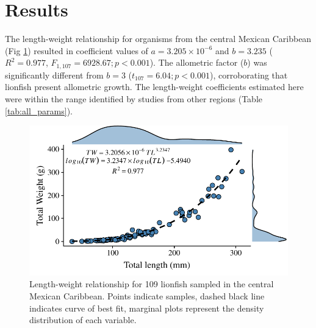 \documentclass[fleqn,10pt,lineno]{wlpeerj} %
\begin{document}
\clearpage

\section*{Results}

The length-weight relationship for organisms from the central Mexican
Caribbean (Fig \ref{fig:l-w-carib}) resulted in coefficient values of
\(a = 3.205 \times 10^{-6}\) and \(b = 3.235\) (\(R^2 = 0.977\),
\(F_{1, 107} = 6928.67; p < 0.001\)). The allometric factor (\(b\)) was
significantly different from \(b = 3\) (\(t_{107} = 6.04; p<0.001\)),
corroborating that lionfish present allometric growth. The length-weight
coefficients estimated here were within the range identified by studies
from other regions (Table \ref{tab:all_params}).

\begin{figure}
\centering
\includegraphics{Manuscript_files/figure-latex/fit1-1.pdf}
\caption{\label{fig:l-w-carib}Length-weight relationship for 109
lionfish sampled in the central Mexican Caribbean. Points indicate
samples, dashed black line indicates curve of best fit, marginal plots
represent the density distribution of each variable.}
\end{figure}
\end{document}
